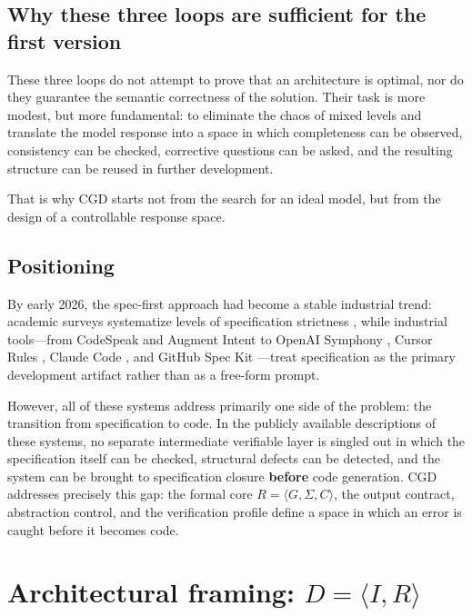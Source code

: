 \documentclass[12pt,a4paper]{article}
\begin{document}
\subsection{Why these three loops are sufficient for the first version}

These three loops do not attempt to prove that an architecture is optimal, nor do they guarantee the semantic correctness of the solution. Their task is more modest, but more fundamental: to eliminate the chaos of mixed levels and translate the model response into a space in which completeness can be observed, consistency can be checked, corrective questions can be asked, and the resulting structure can be reused in further development.

That is why CGD starts not from the search for an ideal model, but from the design of a controllable response space.

\subsection{Positioning}

By early 2026, the spec-first approach had become a stable industrial trend: academic surveys systematize levels of specification strictness \cite{piskala2026sdd}, while industrial tools---from CodeSpeak \cite{breslav2026codespeak} and Augment Intent \cite{augment2026intent} to OpenAI Symphony \cite{openai2026symphony}, Cursor Rules \cite{cursor2026rules}, Claude Code \cite{anthropic2026claudecode}, and GitHub Spec Kit \cite{github2025speckit}---treat specification as the primary development artifact rather than as a free-form prompt.

However, all of these systems address primarily one side of the problem: the transition from specification to code. In the publicly available descriptions of these systems, no separate intermediate verifiable layer is singled out in which the specification itself can be checked, structural defects can be detected, and the system can be brought to specification closure \textbf{before} code generation. CGD addresses precisely this gap: the formal core $R = \langle G, \Sigma, C \rangle$, the output contract, abstraction control, and the verification profile define a space in which an error is caught before it becomes code.

\section{Architectural framing: $D = \langle I, R \rangle$}
\end{document}
